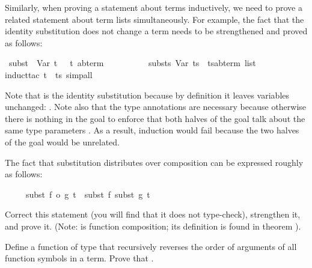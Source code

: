 \begin{isabellebody}
\begin{isamarkuptext}
Similarly, when proving a statement about terms inductively, we need
to prove a related statement about term lists simultaneously. For example,
the fact that the identity substitution does not change a term needs to be
strengthened and proved as follows:%
\end{isamarkuptext}%
\ {\isachardoublequote}subst\ \ Var\ t\ \ {\isacharequal}\ {\isacharparenleft}t\ {\isacharcolon}{\isacharcolon}{\isacharparenleft}{\isacharprime}a{\isacharcomma}{\isacharprime}b{\isacharparenright}term{\isacharparenright}\ \ {\isasymand}\isanewline
\ \ \ \ \ \ \ \ substs\ Var\ ts\ {\isacharequal}\ {\isacharparenleft}ts{\isacharcolon}{\isacharcolon}{\isacharparenleft}{\isacharprime}a{\isacharcomma}{\isacharprime}b{\isacharparenright}term\ list{\isacharparenright}{\isachardoublequote}\isanewline
{}induct{\isacharunderscore}tac\ t\ \ ts{\isacharcomma}\ simp{\isacharunderscore}all{\isacharparenright}%
\begin{isamarkuptext}%
\noindent
Note that  is the identity substitution because by definition it
leaves variables unchanged: . Note also
that the type annotations are necessary because otherwise there is nothing in
the goal to enforce that both halves of the goal talk about the same type
parameters . As a result, induction would fail
because the two halves of the goal would be unrelated.

\begin{exercise}
The fact that substitution distributes over composition can be expressed
roughly as follows:
\begin{isabelle}%
\ \ \ \ \ subst\ {\isacharparenleft}f\ o\ g{\isacharparenright}\ t\ {\isacharequal}\ subst\ f\ {\isacharparenleft}subst\ g\ t{\isacharparenright}%
\end{isabelle}
Correct this statement (you will find that it does not type-check),
strengthen it, and prove it. (Note:  is function composition;
its definition is found in theorem ).
\end{exercise}
\begin{exercise}\label{ex:trev-trev}
  Define a function  of type 
that recursively reverses the order of arguments of all function symbols in a
  term. Prove that .
\end{exercise}


\end{isamarkuptext}
\end{isabellebody}
